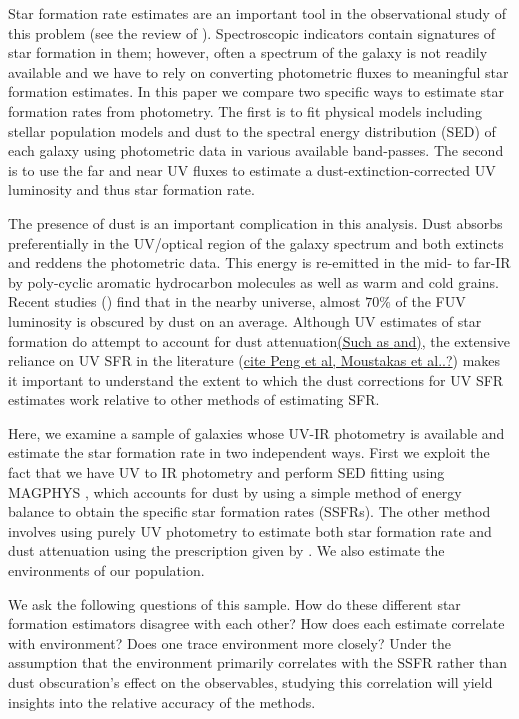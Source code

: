 \documentclass[iop]{emulateapj}
\begin{document}
Star formation rate estimates are an important tool in the observational
study of this problem (see the review of \citealt{kennicutt12a}). 
Spectroscopic indicators contain signatures of star 
formation in them; however, often a spectrum of the galaxy is not 
readily available and we have to rely on converting photometric fluxes 
to meaningful star formation estimates. In this paper we compare 
two specific ways to estimate star formation rates from photometry.
The first is to fit physical models including stellar population
models and dust to the spectral energy distribution 
(SED) of each galaxy using photometric data in various available band-passes.
The second is to use the far and near UV fluxes to estimate a 
dust-extinction-corrected UV luminosity and thus star formation 
rate. 

The presence of dust is an important complication in this analysis.
Dust absorbs preferentially in the UV/optical region of the galaxy 
spectrum and both extincts and reddens the photometric data. This 
energy is re-emitted in the mid- to far-IR by poly-cyclic aromatic 
hydrocarbon molecules as well as warm and cold grains.
Recent studies (\citet{Burg13}) find that in the nearby universe, 
almost $70\%$ of the FUV luminosity is obscured by dust on an 
average. Although UV estimates of star formation do attempt to 
account for dust attenuation\underline{(Such as \citet{salim_uv_2007} and)}, 
the extensive reliance on UV SFR in the literature 
(\underline{cite Peng et al, Moustakas et al..?}) makes it 
important to understand the extent to which the dust corrections 
for UV SFR estimates work relative to other methods of estimating SFR.

Here, we examine a sample of galaxies whose UV-IR photometry 
is available and estimate the star formation rate in two independent 
ways. First we exploit the fact that we have UV to IR photometry 
and perform SED fitting using MAGPHYS \cite{da_cunha_simple_2008}, which 
accounts for dust by using a simple method of energy balance to 
obtain the specific star formation rates (SSFRs). The other method 
involves using purely UV photometry to estimate both star 
formation rate and dust attenuation using the prescription given 
by \citet{salim_uv_2007}. We also estimate the environments of our population.

We ask the following questions of this sample. How do these 
different star formation estimators disagree with each other? 
How does each estimate correlate with environment? Does
one  trace environment more closely? 
Under the assumption that the environment primarily 
correlates with the SSFR rather than dust obscuration's effect
on the observables, studying this correlation will yield 
insights into the relative accuracy of the methods.
\end{document}
